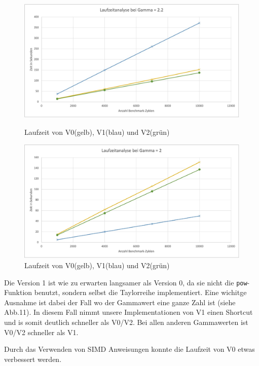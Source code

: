 \documentclass[course=erap]{aspdoc}
\begin{document}
\begin{figure}[h]
\begin{minipage}{0.55\textwidth}
\centering
\includegraphics[width=\textwidth]{Bilder/left.jpeg}
\caption{Laufzeit von V0(gelb), V1(blau) und V2(grün)}
\end{minipage}
\hfill
\begin{minipage}{0.55\textwidth}
\centering
\includegraphics[width=\textwidth]{Bilder/right.jpeg}
\caption{Laufzeit von V0(gelb), V1(blau) und V2(grün)}
\end{minipage}
\end{figure}
    
\par
Die Version 1 ist wie zu erwarten langsamer als Version 0, da sie nicht die \texttt{pow}-Funktion benutzt, sondern selbst die Taylorreihe implementiert. Eine wichitge Ausnahme ist dabei der Fall wo der Gammawert eine ganze Zahl ist (siehe Abb.11). In diesem Fall nimmt unsere Implementationen von V1 einen Shortcut und is somit deutlich schneller als V0/V2. Bei allen anderen Gammawerten ist V0/V2 schneller als V1. 

\par
Durch das Verwenden von SIMD Anweisungen konnte die Laufzeit von V0 etwas verbessert werden.
\end{document}
